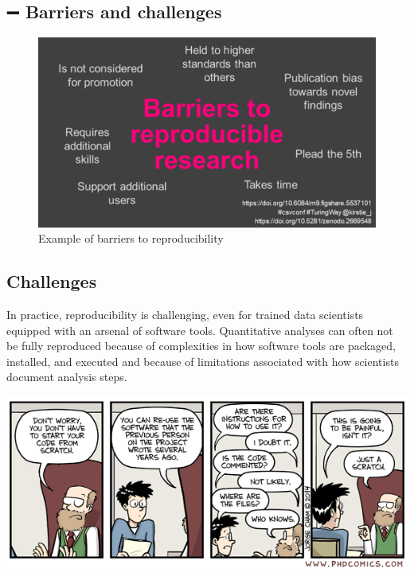 \documentclass[
  letterpaper,
  DIV=11,
  numbers=noendperiod,
  oneside]{scrreprt}
\begin{document}
\subsection{\texorpdfstring{{➖} Barriers and
challenges}{➖ Barriers and challenges}}

\begin{figure}

{\centering \includegraphics{images/paste-80DE769E.png}

}

\caption{\label{fig-barriers-reproducibility}Example of barriers to
reproducibility}

\end{figure}

\subsection{Challenges}

In practice, reproducibility is challenging, even for trained data
scientists equipped with an arsenal of software tools. Quantitative
analyses can often not be fully reproduced because of complexities in
how software tools are packaged, installed, and executed and because of
limitations associated with how scientists document analysis steps.

\includegraphics{images/phd_comics_code_documentation.png}
\end{document}
